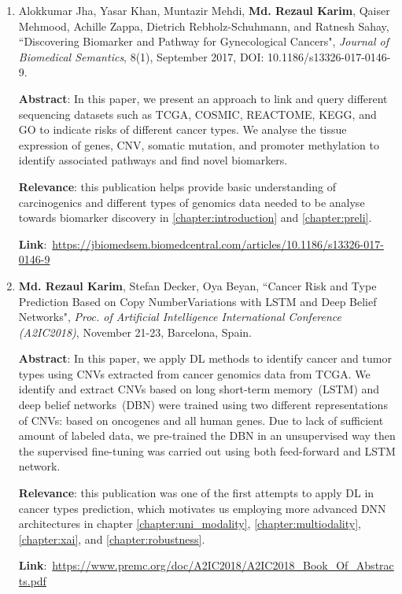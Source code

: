 \begin{enumerate}
	\item {Alokkumar Jha, Yasar Khan, Muntazir Mehdi, \textbf{Md. Rezaul Karim}, Qaiser Mehmood, Achille Zappa, Dietrich Rebholz-Schuhmann, and Ratnesh Sahay, ``Discovering Biomarker and Pathway for Gynecological Cancers", \emph{Journal of Biomedical Semantics}, 8(1), September 2017, DOI: 10.1186/s13326-017-0146-9.} 
	
	\textbf{Abstract}: In this paper, we present an approach to link and query different sequencing datasets such as TCGA, COSMIC, REACTOME, KEGG, and GO to indicate risks of different cancer types. We analyse the tissue expression of genes, CNV, somatic mutation, and promoter methylation to identify associated pathways and find novel biomarkers. 
	
	\textbf{Relevance}: this publication helps provide basic understanding of carcinogenics and different types of genomics data needed to be analyse towards biomarker discovery in \cref{chapter:introduction} and \cref{chapter:preli}.
	
	\textbf{Link}:~\url{https://jbiomedsem.biomedcentral.com/articles/10.1186/s13326-017-0146-9}
	
	\item \textbf{Md. Rezaul Karim}, Stefan Decker, Oya Beyan, ``Cancer Risk and Type Prediction Based on Copy NumberVariations with LSTM and Deep Belief Networks", \emph{Proc. of Artificial Intelligence International Conference (A2IC2018)}, November 21-23, Barcelona, Spain. 
	
	\textbf{Abstract}: In this paper, we apply DL methods to identify cancer and tumor types using CNVs extracted from cancer genomics data from TCGA. We identify and extract CNVs based on long short-term memory~(LSTM) and deep belief networks~(DBN) were trained using two different representations of CNVs: based on oncogenes and all human genes. Due to lack of sufficient amount of labeled data, we pre-trained the DBN in an unsupervised way then the supervised fine-tuning was carried out using both feed-forward and LSTM network. 
	
	\textbf{Relevance}: this publication was one of the first attempts to apply DL in cancer types prediction, which motivates us employing more advanced DNN architectures in chapter  \ref{chapter:uni_modality}, \ref{chapter:multiodality}, \ref{chapter:xai}, and \ref{chapter:robustness}.
	
	\textbf{Link}:~\url{https://www.premc.org/doc/A2IC2018/A2IC2018_Book_Of_Abstracts.pdf}
	

\end{enumerate}
